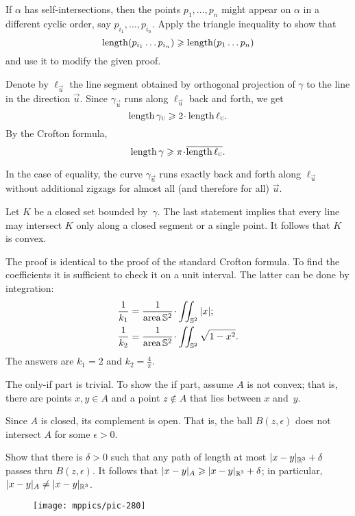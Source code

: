 \begin{multicols}{2}
If $\alpha$ has self-intersections, then the points $p_1,\dots, p_n$ might appear on $\alpha$ in a different cyclic order, say $p_{i_1},\dots,p_{i_n}$.
Apply the triangle inequality to show that 
\[\mathop{\rm length}\nolimits(p_{i_1}\dots p_{i_n})\geqslant \mathop{\rm length}\nolimits (p_1\dots p_n)\]
and use it to modify the given proof.



Denote by $\ell_{\vec u}$ the line segment 
obtained by orthogonal projection of $\gamma$ to the line in the direction ${\vec u}$.
Since $\gamma_{\vec u}$ runs along $\ell_{\vec u}$ back and forth, we get 
\[\length\gamma_{\vec u}\ge 2\cdot\length\ell_{\vec u}.\]
By the Crofton formula, 
\[\length\gamma\ge \pi\cdot \overline{\length\ell_{\vec u}}.\]

In the case of equality, the curve $\gamma_{\vec u}$ runs exactly back and forth along $\ell_{\vec u}$ without additional zigzags for almost all (and therefore for all) ${\vec u}$.

Let $K$ be a closed set bounded by~$\gamma$.
The last statement implies that every line may intersect $K$ only along a closed segment or a single point.
It follows that $K$ is convex.

The proof is identical to the proof of the standard Crofton formula.
To find the coefficients it is sufficient to check it on a unit interval.
The latter can be done by integration:
\begin{align*}
\frac1{k_1}&=\frac{1}{\area \mathbb{S}^2}\cdot\iint_{\mathbb{S}^2} |x|;
\\
\frac1{k_2}&=\frac{1}{\area \mathbb{S}^2}\cdot\iint_{\mathbb{S}^2} \sqrt{1-x^2}.
\end{align*}
The answers are $k_1=2$ and $k_2=\tfrac4\pi$.

The only-if part is trivial.
To show the if part, assume $A$ is not convex;
that is, there are points $x,y\in A$ and a point $z\notin A$ that lies between $x$ and~$y$.

Since $A$ is closed, its complement is open.
That is, the ball $B(z,\epsilon)$ does not intersect $A$ for some $\epsilon>0$.

Show that there is $\delta>0$ such that any path of length at most $\dist{x}{y}{\mathbb{R}^3}+\delta$ passes thru $B(z,\epsilon)$.
It follows that $\dist{x}{y}A\ge \dist{x}{y}{\mathbb{R}^3}+\delta$; 
in particular, $\dist{x}{y}A\ne \dist{x}{y}{\mathbb{R}^3}$.

\begin{wrapfigure}[6]{r}{23 mm}
\vskip-6mm
\centering
\texttt{[image: mppics/pic-280]}
\vskip0mm
\end{wrapfigure}


\end{multicols}
